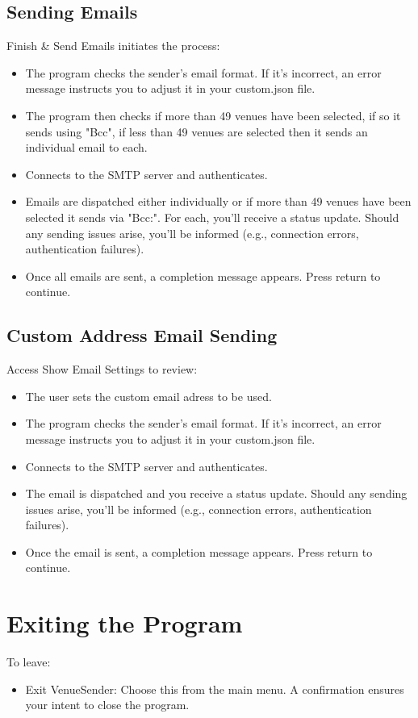 \documentclass{article}
\begin{document}
	\subsection*{Sending Emails}
	Finish \& Send Emails initiates the process:
	\begin{itemize}
		\item The program checks the sender's email format. If it's incorrect, an error message instructs you to adjust it in your custom.json file.
		\item The program then checks if more than 49 venues have been selected, if so it sends using "Bcc", if less than 49 venues are selected then it sends an individual email to each.
		\item Connects to the SMTP server and authenticates.
		\item Emails are dispatched either individually or if more than 49 venues have been selected it sends via "Bcc:". For each, you'll receive a status update. Should any sending issues arise, you'll be informed (e.g., connection errors, authentication failures).
		\item Once all emails are sent, a completion message appears. Press return to continue.
	\end{itemize}
	
	\subsection*{Custom Address Email Sending}
	Access Show Email Settings to review:
	\begin{itemize}
		\item The user sets the custom email adress to be used.
		\item The program checks the sender's email format. If it's incorrect, an error message instructs you to adjust it in your custom.json file.
		\item Connects to the SMTP server and authenticates.
		\item The email is dispatched and you receive a status update. Should any sending issues arise, you'll be informed (e.g., connection errors, authentication failures).
		\item Once the email is sent, a completion message appears. Press return to continue.
	\end{itemize}

	\section*{Exiting the Program}
	To leave:
	\begin{itemize}
		\item Exit VenueSender: Choose this from the main menu. A confirmation ensures your intent to close the program.
	\end{itemize}
	
\end{document}
